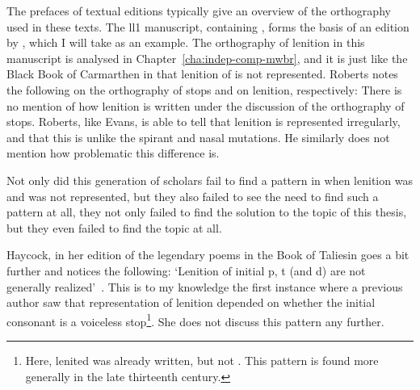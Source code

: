 The prefaces of textual editions typically give an overview of the orthography used in these texts. The \gls{ll1} manuscript, containing , forms the basis of an edition
by \textcite{roberts_brut_1971}, which I will take as an example. The orthography of lenition in this manuscript is analysed in Chapter~\ref{cha:indep-comp-mwbr}, and it is just like the Black Book of Carmarthen in that lenition of  is not represented. Roberts notes the following on the
orthography of stops and on lenition, respectively:
There is no mention of how lenition is written under the discussion of the orthography of stops. 
Roberts, like Evans, is able to tell that lenition is represented irregularly, and that this is unlike the spirant and nasal mutations. He similarly does not mention how problematic this difference is.

Not only did this generation of scholars fail to find a pattern in when lenition was and was not represented, but they also failed to see the need to find such a pattern at all, \ie they not only failed to find the solution to the topic of this thesis, but they even failed to find the topic at all.

Haycock, in her edition of the legendary poems in the Book of Taliesin goes a bit further and notices the following: `Lenition of initial p, t (and d) are not generally realized'~\autocite[p.~7, n.~18]{haycock_legendary_2015}. This is to my knowledge the first instance where a previous author saw that representation of lenition depended on whether the initial consonant is a voiceless stop\footnote{Here, lenited  was already written, but not . This pattern is found more generally in the late thirteenth century.}. She does not discuss this pattern any further. 

